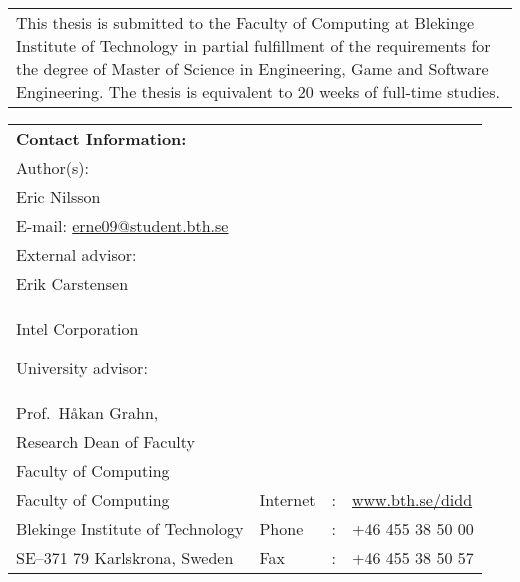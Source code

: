 {\pagestyle{empty}
\changepage{5cm}{1cm}{-0.5cm}{-0.5cm}{}{-2cm}{}{}{}
\noindent%
\begin{tabular}{p{\textwidth}}
{\small This thesis is submitted to the Faculty of Computing at Blekinge
Institute of Technology in partial fulfillment of the requirements for the degree of Master of Science in Engineering, Game and Software Engineering. The thesis is equivalent to $20$ weeks of
full-time studies.}
\end{tabular}

\par\vspace {14cm}

\noindent%
\begin{tabular}{p{}lcl}
\textbf{Contact Information:}\\
Author(s):\\
Eric Nilsson\\
E-mail: \href{mailto:erne09@student.bth.se}{erne09@student.bth.se} \\ %
\par\vspace {0.5cm}
External advisor:\\
Erik Carstensen\\
Intel Corporation
\par\vspace {0.5cm}
University advisor:\\
Prof.\ Håkan Grahn,\\
Research Dean of Faculty\\
Faculty of Computing

\par\vspace {0.5cm}

\noindent%
 \\
Faculty of Computing & Internet & : & \href{http://www.bth.se/didd}{www.bth.se/didd}\\
Blekinge Institute of Technology & Phone	& : & +46 455 38 50 00 \\
SE--371 79 Karlskrona, Sweden & Fax & : & +46 455 38 50 57 \\
\end{tabular}
\clearpage
} %

\setcounter{page}{1}
